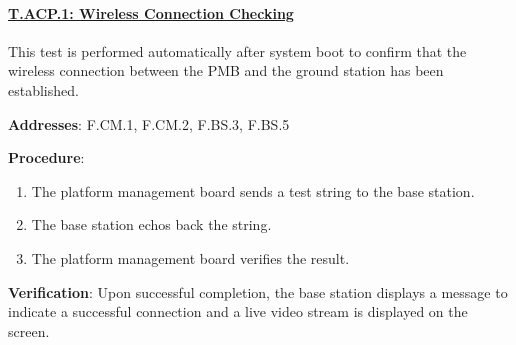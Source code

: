 \paragraph{\underline{T.ACP.1: Wireless Connection Checking}}

This test is performed automatically after system boot to confirm that the wireless connection between the PMB and the ground station has been established.

\textbf{Addresses}: F.CM.1, F.CM.2, F.BS.3, F.BS.5

\textbf{Procedure}:
\begin{enumerate}[noitemsep]
    \item The platform management board sends a test string to the base station.
    \item The base station echos back the string.
    \item The platform management board verifies the result.
\end{enumerate}

\textbf{Verification}: 
Upon successful completion, the base station displays a message to indicate a successful connection and a live video stream is displayed on the screen.